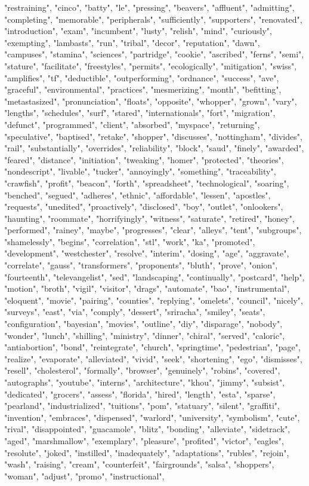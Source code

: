 "restraining", "cinco", "batty", "le", "pressing", "beavers", "affluent", "admitting", "completing", "memorable", "peripherals", "sufficiently", "supporters", "renovated", "introduction", "exam", "incumbent", "lusty", "relish", "mind", "curiously", "exempting", "lambasts", "run", "tribal", "decor", "reputation", "dawn", "campuses", "stamina", "sciences", "partridge", "cookie", "ascribed", "ferns", "semi", "stature", "facilitate", "freestyles", "permits", "ecologically", "mitigation", "swiss", "amplifies", "tf", "deductible", "outperforming", "ordnance", "success", "ave", "graceful", "environmental", "practices", "mesmerizing", "month", "befitting", "metastasized", "pronunciation", "floats", "opposite", "whopper", "grown", "vary", "lengths", "schedules", "surf", "stared", "internationals", "fort", "migration", "defunct", "programmed", "client", "absorbed", "myspace", "returning", "speculative", "baptised", "retake", "shopper", "discusses", "nottingham", "divides", "rail", "substantially", "overrides", "reliability", "block", "saud", "finely", "awarded", "feared", "distance", "initiation", "tweaking", "homer", "protected", "theories", "nondescript", "livable", "tucker", "annoyingly", "something", "traceability", "crawfish", "profit", "beacon", "forth", "spreadsheet", "technological", "soaring", "benched", "segued", "adheres", "ethnic", "affordable", "lessen", "apostles", "requests", "unedited", "proactively", "disclosed", "boy", "outlet", "onlookers", "haunting", "roommate", "horrifyingly", "witness", "saturate", "retired", "honey", "performed", "rainey", "maybe", "progresses", "clear", "alleys", "tent", "subgroups", "shamelessly", "begins", "correlation", "stl", "work", "ka", "promoted", "development", "westchester", "resolve", "interim", "dosing", "age", "aggravate", "correlate", "gauss", "transformers", "proponents", "bluth", "prove", "onion", "fourteenth", "televangelist", "sed", "landscaping", "continually", "postcard", "help", "motion", "broth", "vigil", "visitor", "drags", "automate", "bao", "instrumental", "eloquent", "movie", "pairing", "counties", "replying", "omelets", "council", "nicely", "surveys", "east", "via", "comply", "dessert", "sriracha", "smiley", "seats", "configuration", "bayesian", "movies", "outline", "diy", "disparage", "nobody", "wonder", "lunch", "shilling", "ministry", "dinner", "chiral", "served", "caloric", "antiabortion", "bond", "reintegrate", "church", "springtime", "pedestrian", "page", "realize", "evaporate", "alleviated", "vivid", "seek", "shortening", "ego", "dismisses", "resell", "cholesterol", "formally", "browser", "genuinely", "robins", "covered", "autographs", "youtube", "interns", "architecture", "khou", "jimmy", "subsist", "dedicated", "grocers", "assess", "florida", "hired", "length", "esta", "sparse", "pearland", "industrialized", "tuitions", "pom", "statuary", "silent", "graffiti", "invention", "embraces", "dispensed", "warlord", "university", "symbolism", "cute", "rival", "disappointed", "guacamole", "blitz", "bonding", "alleviate", "sidetrack", "aged", "marshmallow", "exemplary", "pleasure", "profited", "victor", "eagles", "resolute", "joked", "instilled", "inadequately", "adaptations", "rubles", "rejoin", "wash", "raising", "cream", "counterfeit", "fairgrounds", "salsa", "shoppers", "woman", "adjust", "promo", "instructional", 